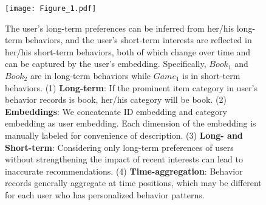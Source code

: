 \documentclass[preprint,12pt]{elsarticle}
\begin{document}
\begin{sloppypar}
\begin{figure}
	\centering
	\texttt{[image: Figure\_1.pdf]}
	\caption{The user's long-term preferences can be inferred from her/his long-term behaviors, and the user's short-term interests are reflected in her/his short-term behaviors, both of which change over time and can be captured by the user's embedding. Specifically, $Book_1$ and $Book_2$ are in long-term behaviors while $Game_1$ is in short-term behaviors. (1) \textbf{Long-term}: If the prominent item category in user's behavior records is book, her/his category will be book. (2) \textbf{Embeddings}: We concatenate ID embedding and category embedding as user embedding. Each dimension of the embedding is manually labeled for convenience of description. (3) \textbf{Long- and Short-term}: Considering only long-term preferences of users without strengthening the impact of recent interests can lead to inaccurate recommendations. (4) \textbf{Time-aggregation}: Behavior records generally aggregate at time positions, which may be different for each user who has personalized behavior patterns.}\label{fig:1}
\end{figure}


\end{sloppypar}
\end{document}
